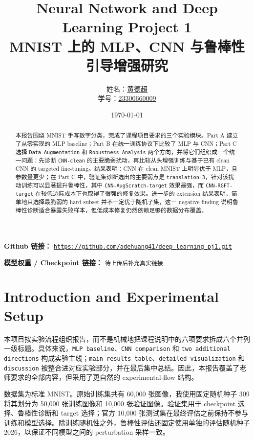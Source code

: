 \documentclass[12pt,a4paper,fontset=fandol]{ctexart}
\title{Neural Network and Deep Learning Project 1\\
\large MNIST 上的 MLP、CNN 与鲁棒性引导增强研究}
\author{
姓名：\underline{黄德超}\\
学号：\underline{23300660009}
}
\date{\today}
\begin{document}
\maketitle

\noindent
\textbf{Github 链接：}
\href{https://github.com/adehuang41/deep_learning_pj1.git}
{\texttt{https://github.com/adehuang41/deep\_learning\_pj1.git}}

\noindent
\textbf{模型权重 / Checkpoint 链接：}
\href{https://your-checkpoint-link}{\texttt{待上传后补充真实链接}}

\begin{abstract}
本报告围绕 MNIST 手写数字分类，完成了课程项目要求的三个实验模块。Part A 建立了从零实现的 MLP baseline；Part B 在统一训练协议下比较了 MLP 与 CNN；Part C 选择 \texttt{Data Augmentation} 和 \texttt{Robustness Analysis} 两个方向，并将它们组织成一个统一问题：先诊断 \texttt{CNN-clean} 的主要脆弱扰动，再比较从头增强训练与基于已有 clean CNN 的 targeted fine-tuning。结果表明：CNN 在 clean MNIST 上明显优于 MLP，且参数量更少；在 Part C 中，验证集诊断选出的主要弱点是 \texttt{translation-3}，针对该扰动训练可以显著提升鲁棒性，其中 \texttt{CNN-AugScratch-target} 效果最强，而 \texttt{CNN-RGFT-target} 在较低边际成本下也取得了很强的修复效果。进一步的 extension 结果表明，简单地只选择最脆弱的 hard subset 并不一定优于随机子集，这一 negative finding 说明鲁棒性诊断适合暴露失败样本，但低成本修复仍然依赖足够的数据分布覆盖。
\end{abstract}

\section{Introduction and Experimental Setup}

本项目按实验流程组织报告，而不是机械地把课程说明中的六项要求拆成六个并列一级标题。具体来说，\texttt{MLP baseline}、\texttt{CNN comparison} 和 \texttt{two additional directions} 构成实验主线；\texttt{main results table}、\texttt{detailed visualization} 和 \texttt{discussion} 被整合进对应实验部分，并在最后集中总结。因此，本报告覆盖了老师要求的全部内容，但采用了更自然的 experimental-flow 结构。

数据集为标准 MNIST。原始训练集共有 60{,}000 张图像，我使用固定随机种子 309 将其划分为 50{,}000 张训练图像和 10{,}000 张验证图像。验证集用于 checkpoint 选择、鲁棒性诊断和 target 选择；官方 10{,}000 张测试集在最终评估之前保持不参与训练和模型选择。除训练随机性之外，鲁棒性评估还固定使用单独的评估随机种子 2026，以保证不同模型之间的 perturbation 采样一致。
\end{document}
